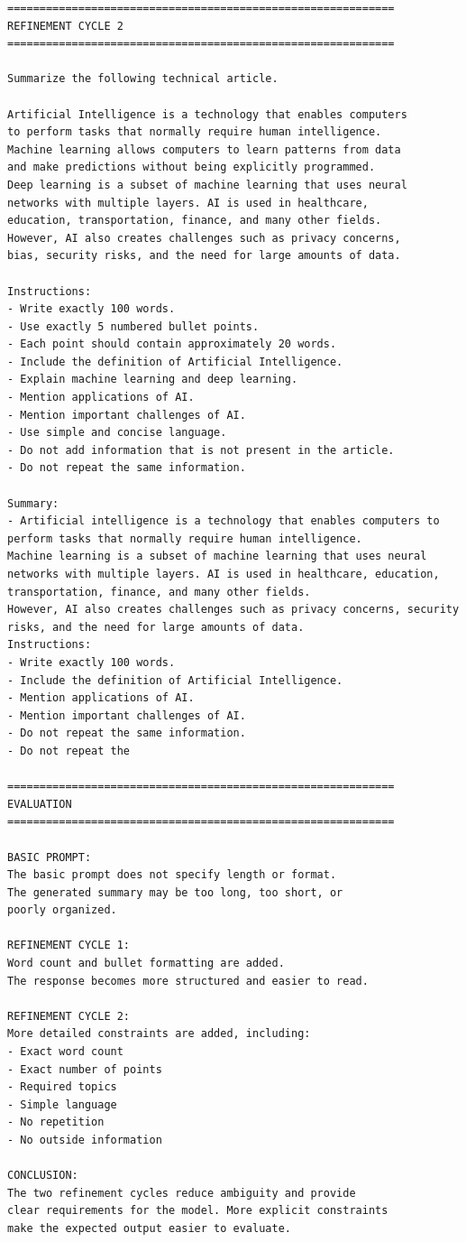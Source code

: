 \documentclass[10pt,a4paper]{article}
\begin{document}
\begin{lstlisting}[style=output]
============================================================
REFINEMENT CYCLE 2
============================================================

Summarize the following technical article.

Artificial Intelligence is a technology that enables computers
to perform tasks that normally require human intelligence.
Machine learning allows computers to learn patterns from data
and make predictions without being explicitly programmed.
Deep learning is a subset of machine learning that uses neural
networks with multiple layers. AI is used in healthcare,
education, transportation, finance, and many other fields.
However, AI also creates challenges such as privacy concerns,
bias, security risks, and the need for large amounts of data.

Instructions:
- Write exactly 100 words.
- Use exactly 5 numbered bullet points.
- Each point should contain approximately 20 words.
- Include the definition of Artificial Intelligence.
- Explain machine learning and deep learning.
- Mention applications of AI.
- Mention important challenges of AI.
- Use simple and concise language.
- Do not add information that is not present in the article.
- Do not repeat the same information.

Summary:
- Artificial intelligence is a technology that enables computers to perform tasks that normally require human intelligence.
Machine learning is a subset of machine learning that uses neural
networks with multiple layers. AI is used in healthcare, education, transportation, finance, and many other fields.
However, AI also creates challenges such as privacy concerns, security risks, and the need for large amounts of data.
Instructions:
- Write exactly 100 words.
- Include the definition of Artificial Intelligence.
- Mention applications of AI.
- Mention important challenges of AI.
- Do not repeat the same information.
- Do not repeat the

============================================================
EVALUATION
============================================================

BASIC PROMPT:
The basic prompt does not specify length or format.
The generated summary may be too long, too short, or
poorly organized.

REFINEMENT CYCLE 1:
Word count and bullet formatting are added.
The response becomes more structured and easier to read.

REFINEMENT CYCLE 2:
More detailed constraints are added, including:
- Exact word count
- Exact number of points
- Required topics
- Simple language
- No repetition
- No outside information

CONCLUSION:
The two refinement cycles reduce ambiguity and provide
clear requirements for the model. More explicit constraints
make the expected output easier to evaluate.
\end{lstlisting}
\end{document}
